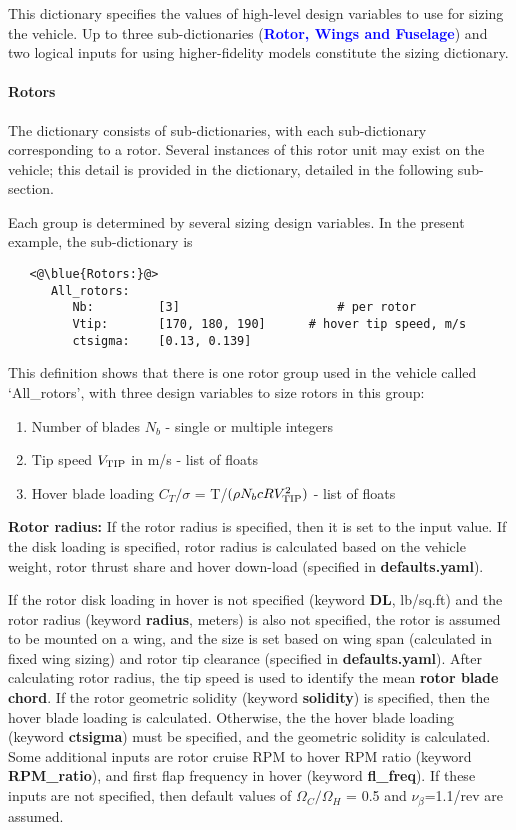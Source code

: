 \subsubsection{}
This dictionary specifies the values of high-level design variables to use for sizing the vehicle. Up to three sub-dictionaries (\textcolor{blue}{\textbf{Rotor, Wings and Fuselage}}) and two logical inputs for using higher-fidelity models constitute the sizing dictionary.

\paragraph{Rotors}
The  dictionary consists of sub-dictionaries, with each sub-dictionary corresponding to a rotor. Several instances of this rotor unit may exist on the vehicle; this detail is provided in the  dictionary, detailed in the following sub-section.

Each  group is determined by several sizing design variables. In the present example, the  sub-dictionary is 
\begin{lstlisting}
   <@\blue{Rotors:}@>
      All_rotors:
         Nb:         [3]                      # per rotor
         Vtip:       [170, 180, 190]      # hover tip speed, m/s
         ctsigma:    [0.13, 0.139]
\end{lstlisting}
This definition shows that there is one rotor group used in the vehicle called `All\_rotors', with three design variables to size rotors in this group:
\begin{enumerate}
\item Number of blades $N_b$ - single or multiple integers
\item Tip speed $V_{\rm TIP}$ in m/s - list of floats
\item Hover blade loading $C_T/\sigma$ = T/$(\rho N_b c R V_{\rm TIP}^2)$ - list of floats
\end{enumerate}
\textbf{Rotor radius:} If the rotor radius is specified, then it is set to the input value. If the disk loading is specified, rotor radius is calculated based on the vehicle weight, rotor thrust share and hover down-load (specified in \textbf{defaults.yaml}). 

If the rotor disk loading in hover is not specified (keyword \textbf{DL}, lb/sq.ft) and the rotor radius (keyword \textbf{radius}, meters) is also not specified, the rotor is assumed to be mounted on a wing, and the size is set based on wing span (calculated in fixed wing sizing) and rotor tip clearance (specified in \textbf{defaults.yaml}). After calculating rotor radius, the tip speed is used to identify the mean \textbf{rotor blade chord}. If the rotor geometric solidity (keyword \textbf{solidity}) is specified, then the hover blade loading is calculated. Otherwise, the the hover blade loading (keyword \textbf{ctsigma}) must be specified, and the geometric solidity is calculated. Some additional inputs are rotor cruise RPM to hover RPM ratio (keyword \textbf{RPM\_ratio}), and first flap frequency in hover (keyword \textbf{fl\_freq}). If these inputs are not specified, then default values of $\Omega_C/\Omega_H$ = 0.5 and $\nu_\beta$=1.1/rev are assumed. 

